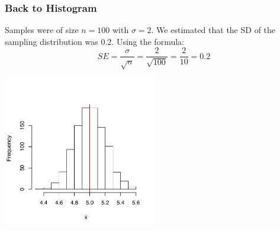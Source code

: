 \documentclass[handout]{beamer}
\begin{document}
\begin{frame}[fragile]
\frametitle{Back to Histogram}
Samples were of size $n=100$ with $\sigma=2$.  We estimated that the SD of the sampling distribution was 0.2.  Using the formula:
\[
SE = \frac{\sigma}{\sqrt{n}} = \frac{2}{\sqrt{100}} = \frac{2}{10} = 0.2
\]
\begin{center}
\includegraphics[width=0.5\textwidth]{figure/lec12-001}
\end{center}


\end{frame}
\end{document}
